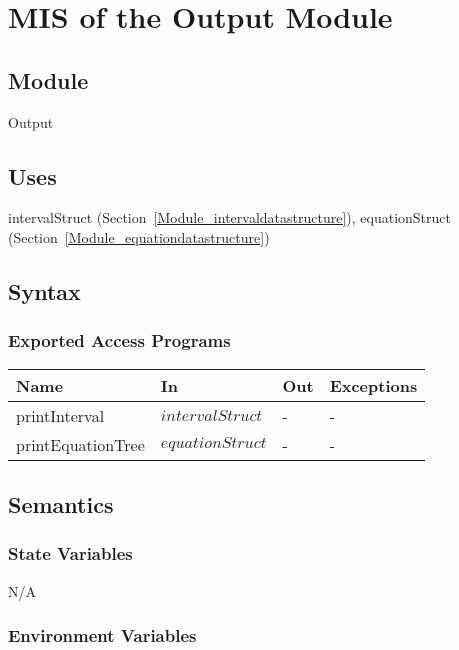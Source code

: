 \documentclass[12pt, titlepage]{article}
\begin{document}
\newpage

\section{MIS of the Output Module} 
\label{Module_output}

\subsection{Module}

Output

\subsection{Uses}

intervalStruct (Section~\ref{Module_intervaldatastructure}), equationStruct 
(Section~\ref{Module_equationdatastructure})

\subsection{Syntax}

\subsubsection{Exported Access Programs}

\begin{center}
	\begin{tabular}{p{3cm} p{3cm} p{3cm} p{5cm}}
		\hline
		\textbf{Name} & \textbf{In} & \textbf{Out} & \textbf{Exceptions} \\
		\hline
		printInterval & $intervalStruct$ & - & - \\
		printEquationTree & $equationStruct$ & - & - \\
		\hline
	\end{tabular}
\end{center}

\subsection{Semantics}

\subsubsection{State Variables}

N/A

\subsubsection{Environment Variables}
\end{document}
